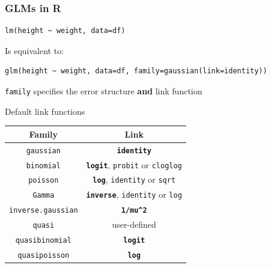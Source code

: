 \documentclass[pdf,handout]{beamer}
\begin{document}
\begin{frame}[fragile]
\frametitle{GLMs in R}


\begin{lstlisting}[style=R]
lm(height ~ weight, data=df)
\end{lstlisting}


Is equivalent to:
\vfill

\begin{lstlisting}[style=R]
glm(height ~ weight, data=df, family=gaussian(link=identity))
\end{lstlisting}

\vfill

\texttt{family} specifies the error structure \textbf{and} link function

\end{frame}

\begin{frame}{Default link functions}

\begin{longtable}[]{c|c}
\textbf{Family} & \textbf{Link}\tabularnewline\hline
\texttt{gaussian} & \textbf{\texttt{identity}}\tabularnewline
\texttt{binomial} & \textbf{\texttt{logit}}, \texttt{probit} or
\texttt{cloglog}\tabularnewline
\texttt{poisson} & \textbf{\texttt{log}}, \texttt{identity} or
\texttt{sqrt}\tabularnewline
\texttt{Gamma} & \textbf{\texttt{inverse}}, \texttt{identity} or
\texttt{log}\tabularnewline
\texttt{inverse.gaussian} & \textbf{\texttt{1/mu\^{}2}}\tabularnewline
\texttt{quasi} & user-defined\tabularnewline
\texttt{quasibinomial} & \textbf{\texttt{logit}}\tabularnewline
\texttt{quasipoisson} & \textbf{\texttt{log}}\tabularnewline
\end{longtable}

\end{frame}
\end{document}
